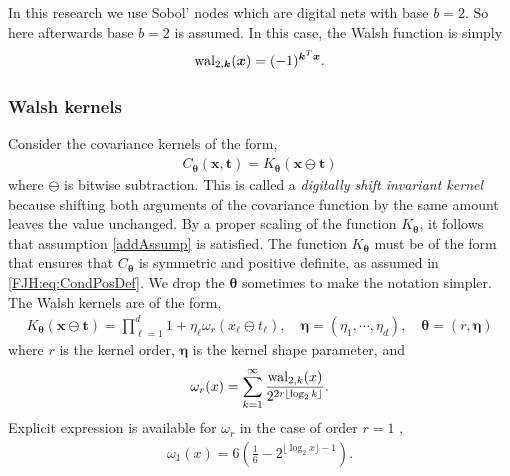 \documentclass{svjour3}                     %
\newcommand{\bm}[1]{\boldsymbol{#1}}
\newcommand{\veta}{{\bm{\eta}}}
\newcommand{\vtheta}{{\bm{\theta}}}
\newcommand{\vk}{\bm{k}}
\newcommand{\vt}{\bm{t}}
\newcommand{\vx}{\bm{x}}
\newcommand{\JRNote}[1]{{\textcolor{green}{JR: #1}}}
\begin{document}
In this research we use Sobol' nodes which are digital nets with base $b=2$. So here afterwards base $b=2$ is assumed. %
In this case, the Walsh function is simply $$\textup{wal}_{2,\vk} (\vx) = (-1)^{\vec{\vk}^T \vec{\vx}}.$$

\subsubsection{Walsh kernels}
Consider the covariance kernels of the form,
\begin{align}
\label{eqn:digital_shift_in_kernel}
C_{\vtheta}(\vx, \vt) = K_{\vtheta} (\vx \ominus \vt) 
\end{align}
where $\ominus$ is bitwise subtraction.
This is called a \emph{digitally shift invariant kernel} because shifting both arguments of the covariance function by the same amount leaves the value unchanged. By a proper scaling of the function $K_{\vtheta}$, it follows that assumption \eqref{addAssump} is satisfied. The function $K_{\vtheta}$ must be of the form that ensures that $C_{\vtheta}$ is symmetric and positive definite, as assumed in \eqref{FJH:eq:CondPosDef}. We drop the ${\vtheta}$ sometimes to make the notation simpler.
The Walsh kernels are of the form,
\begin{align}
\label{eqn:walsh_kernel}
K_{\vtheta} (\vx \ominus \vt) =  
\prod_{\ell=1}^d  1 + \eta_\ell \omega_{r} (x_\ell \ominus t_\ell), \quad \veta = (\eta_1, \cdots, \eta_d), \quad \vtheta = (r, \veta)
\end{align}
where $r$ is the kernel order, $\veta$ is the kernel shape parameter, and
\begin{align*}
\omega_r(x) = \sum_{k=1}^\infty 
\frac{\textup{wal}_{2,k}(x) }{2^{2r \lfloor \log_2 k \rfloor}}.
\end{align*}
Explicit expression is available for $\omega_{r}$ in the case of order $r=1$ \cite{Nuyens2013}, %
\begin{align}
\label{eqn:omega1}
\omega_1(x) 
= 6\left( \frac 16 - 2^{\lfloor \log_2 x \rfloor -1 }\right).
\end{align}
\end{document}
